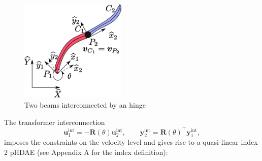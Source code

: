 \documentclass{svjour3}                     %
\begin{document}
\begin{figure}[t]
	\centering
	\includegraphics[width=0.45\textwidth]{beam_int.eps} 
	
	\caption{Two beams interconnected by an hinge }
	\label{fig:beam_int}
\end{figure}

The transformer interconnection
\begin{equation}
\label{eq:int_hinge}
\mathbf{u}_1^{\text{int}} = -\mathbf{R}(\theta) \mathbf{u}_2^{\text{int}}, \qquad
\mathbf{y}_2^{\text{int}} = \mathbf{R}(\theta)^\top \mathbf{y}_1^{\text{int}},
\end{equation}
imposes the constraints on the velocity level and gives rise to a quasi-linear index 2 pHDAE (see Appendix A for the index definition):
\end{document}
